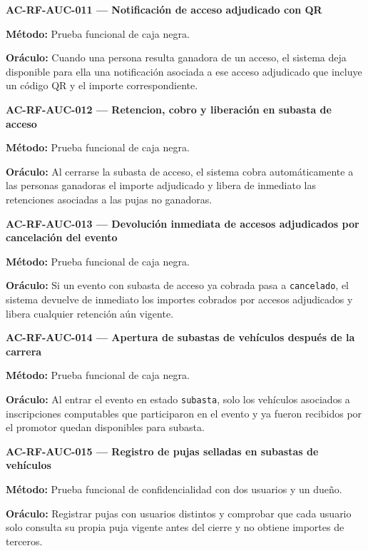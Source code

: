 \documentclass[10pt,letterpaper]{article}
\begin{document}
\noindent\textbf{AC-RF-AUC-011 --- Notificación de acceso adjudicado con QR}\par
\textbf{Método:} Prueba funcional de caja negra.\par
\textbf{Oráculo:} Cuando una persona resulta ganadora de un acceso, el sistema deja disponible para ella una notificación asociada a ese acceso adjudicado que incluye un código QR y el importe correspondiente.\par\vspace{0.45em}
\noindent\textbf{AC-RF-AUC-012 --- Retencion, cobro y liberación en subasta de acceso}\par
\textbf{Método:} Prueba funcional de caja negra.\par
\textbf{Oráculo:} Al cerrarse la subasta de acceso, el sistema cobra automáticamente a las personas ganadoras el importe adjudicado y libera de inmediato las retenciones asociadas a las pujas no ganadoras.\par\vspace{0.45em}
\noindent\textbf{AC-RF-AUC-013 --- Devolución inmediata de accesos adjudicados por cancelación del evento}\par
\textbf{Método:} Prueba funcional de caja negra.\par
\textbf{Oráculo:} Si un evento con subasta de acceso ya cobrada pasa a \texttt{cancelado}, el sistema devuelve de inmediato los importes cobrados por accesos adjudicados y libera cualquier retención aún vigente.\par\vspace{0.45em}
\noindent\textbf{AC-RF-AUC-014 --- Apertura de subastas de vehículos después de la carrera}\par
\textbf{Método:} Prueba funcional de caja negra.\par
\textbf{Oráculo:} Al entrar el evento en estado \texttt{subasta}, solo los vehículos asociados a inscripciones computables que participaron en el evento y ya fueron recibidos por el promotor quedan disponibles para subasta.\par\vspace{0.45em}
\noindent\textbf{AC-RF-AUC-015 --- Registro de pujas selladas en subastas de vehículos}\par
\textbf{Método:} Prueba funcional de confidencialidad con dos usuarios y un dueño.\par
\textbf{Oráculo:} Registrar pujas con usuarios distintos y comprobar que cada usuario solo consulta su propia puja vigente antes del cierre y no obtiene importes de terceros.\par\vspace{0.45em}
\end{document}
